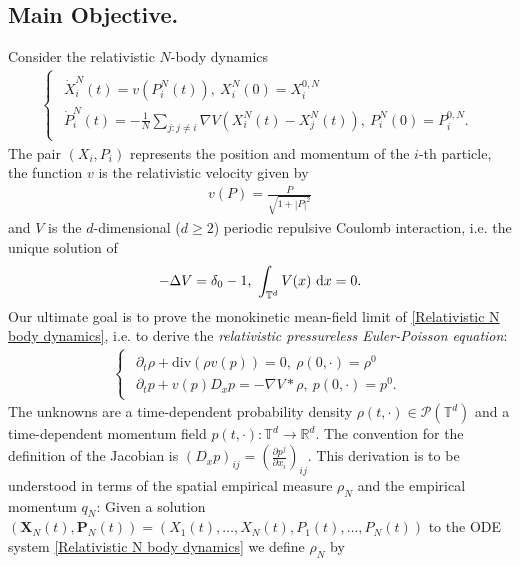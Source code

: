 \documentclass[11pt,reqno]{amsart}
\numberwithin{equation}{section}
\def\dd{{\rm d}}
\begin{document}
\subsection{Main Objective.} Consider the relativistic $N$-body dynamics 
\begin{align}\tag{$N$r}
\begin{cases}
\begin{array}{lc}
     \dot X_{i}^
     {N}(t)=v(P_{i}^{N}(t)),\ X_{i}^{N}(0)=X_{i}^{0,N}  \\
     \dot P_{i}^{N}(t)=-\frac{1}{N}\sum_{j:j\neq i}\nabla V(X_{i}^{N}(t)-X_{j}^{N}(t)),\ P_{i}^{N}(0)=P_{i}^{0,N}.  
\end{array}
\end{cases}
\label{Relativistic N body dynamics}
\end{align}
The pair $(X_{i},P_{i})$ represents the position and momentum of the $i$-th particle, the function $v$ is the relativistic velocity given by 
\begin{align}
v(P)=\frac{P}{\sqrt{1+\left\vert P\right\vert^{2}}} \label{def of v}    
\end{align}
and $V$ is the $d$-dimensional ($d\geq 2$) periodic repulsive Coulomb interaction, i.e. the unique solution of 
\begin{align*}
-\Delta V=\delta_{0}-1, \ \int_{\mathbb{T}^{d}}V(x)\ \dd x=0.     
\end{align*}
Our ultimate goal is to prove the monokinetic mean-field limit of \eqref{Relativistic N body dynamics}, i.e. to derive the \textit{relativistic pressureless Euler-Poisson equation}:
\begin{align}\tag{EPr}
\begin{cases}
\begin{array}{lc}
\partial_{t}\rho+\mathrm{div}(\rho v(p))=0, \ \rho(0,\cdot)=\rho^{0}
       \\
\partial_{t}p+v(p)D_{x}p=-\nabla V\ast \rho,\ p(0,\cdot)=p^{0}.        
\end{array}  
\end{cases}
\label{Relativistic Euler intro}
\end{align}  
The unknowns are a time-dependent probability density $\rho(t,\cdot)\in \mathcal{P}(\mathbb{T}^{d})$ and a time-dependent momentum field $p(t,\cdot):\mathbb{T}^{d}\rightarrow \mathbb{R}^{d}$. The convention for the definition of the Jacobian is $(D_{x}p)_{ij}=(\frac{\partial p^{j}}{\partial x_{i}})_{ij}$. 
This derivation is to be understood in terms of the spatial empirical measure $\rho_{N}$ and the empirical momentum $q_{N}$: Given a solution $(\mathbf{X}_{N}(t),\mathbf{P}_{N}(t))=\left(X_{1}(t),\dots,X_{N}(t),P_{1}(t),\dots, P_{N}(t)\right)$ to the ODE system \eqref{Relativistic N body dynamics} we define $\rho_{N}$ by 
\end{document}
